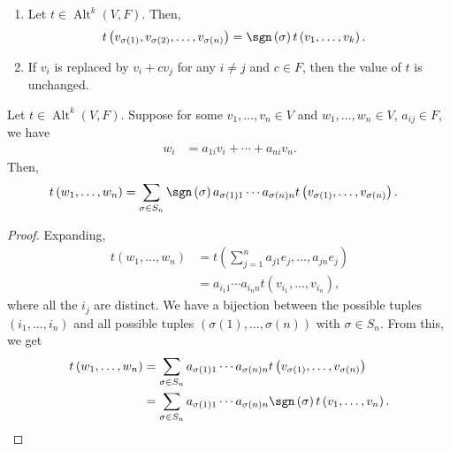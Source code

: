 \documentclass[10pt]{mypackage}
\DeclareMathOperator{\Alt}{Alt}
\begin{document}
    \begin{lemma}\hfill
      \begin{enumerate}[(1)]
        \item Let $t\in \Alt^{k}\left(V,F\right)$. Then,
        \begin{align*}
          t\left(v_{\sigma(1)},v_{\sigma(2)},\dots,v_{\sigma(n)}\right) &= \sgn\left(\sigma\right)t\left(v_1,\dots,v_k\right).
        \end{align*}
        \item If $v_i$ is replaced by $v_i + cv_j$ for any $i\neq j$ and $c\in F$, then the value of $t$ is unchanged.
      \end{enumerate}
    \end{lemma}
  \begin{proposition}
    Let $t\in \Alt^{k}\left(V,F\right)$. Suppose for some $v_1,\dots,v_n\in V$ and $w_1,\dots,w_n\in V$, $a_{ij}\in F$, we have
    \begin{align*}
      w_{i} &= a_{1i}v_i + \cdots + a_{ni}v_n.
    \end{align*}
    Then,
    \begin{align*}
      t\left(w_1,\dots,w_n\right) &= \sum_{\sigma\in S_n} \sgn\left(\sigma\right)a_{\sigma(1)1}\cdots a_{\sigma(n)n}t\left(v_{\sigma(1)},\dots,v_{\sigma(n)}\right).
    \end{align*}
  \end{proposition}
  \begin{proof}
    Expanding,
    \begin{align*}
      t\left(w_1,\dots,w_n\right) &= t\left(\sum_{j=1}^{n}a_{j1}e_j,\dots,a_{jn}e_{j}\right)\\
                                  &= a_{i_1 1}\cdots a_{i_nn}t\left(v_{i_1},\dots,v_{i_n}\right),
    \end{align*}
    where all the $i_j$ are distinct. We have a bijection between the possible tuples $\left(i_1,\dots,i_n\right)$ and all possible tuples $\left(\sigma(1),\dots,\sigma\left(n\right)\right)$ with $\sigma\in S_n$. From this, we get
    \begin{align*}
      t\left(w_1,\dots,w_n\right) &= \sum_{\sigma\in S_n} a_{\sigma(1)1}\cdots a_{\sigma(n)n}t\left(v_{\sigma(1)},\dots,v_{\sigma(n)}\right)\\
                                  &= \sum_{\sigma\in S_n}a_{\sigma(1)1}\cdots a_{\sigma(n)n}\sgn\left(\sigma\right)t\left(v_1,\dots,v_n\right).
    \end{align*}
  \end{proof}
\end{document}
